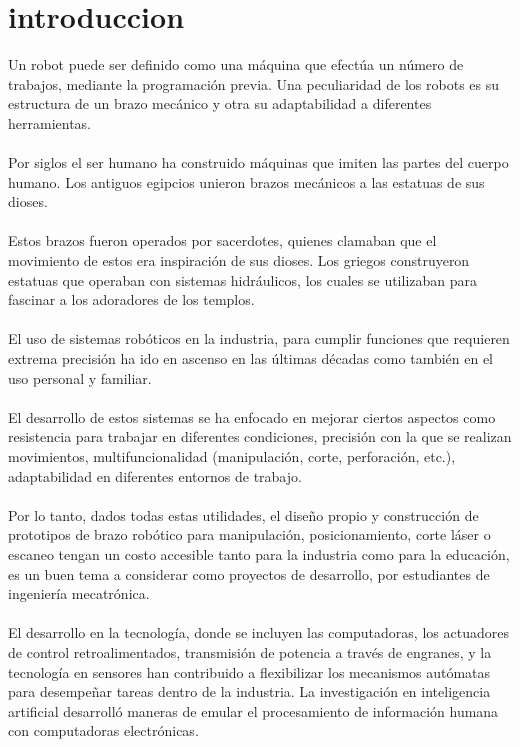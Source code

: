 \documentclass[12pt,letterpaper]{article}
\begin{document}
\section*{introduccion}
Un robot puede ser definido como una máquina que efectúa un número de trabajos, mediante la programación previa. Una peculiaridad de los robots es su estructura de un brazo mecánico y otra su adaptabilidad a diferentes herramientas.
\\\\
Por siglos el ser humano ha construido máquinas que imiten las partes del cuerpo humano. Los antiguos egipcios unieron brazos mecánicos a las estatuas de sus dioses.
\\\\ 
Estos brazos fueron operados por sacerdotes, quienes clamaban que el movimiento de estos era inspiración de sus dioses. Los griegos construyeron estatuas que operaban con sistemas hidráulicos, los cuales se utilizaban para fascinar a los adoradores de los templos.
\\\\
El uso de sistemas robóticos en la industria, para cumplir funciones que requieren extrema precisión ha ido en ascenso en las últimas décadas como también en el uso personal y familiar.
\\\\
El desarrollo de estos sistemas se ha enfocado en mejorar ciertos aspectos como resistencia para trabajar en diferentes condiciones, precisión con la que se realizan movimientos, multifuncionalidad (manipulación, corte, perforación, etc.), adaptabilidad en diferentes entornos de trabajo.
\\\\
Por lo tanto, dados todas estas utilidades, el diseño propio y construcción de prototipos de brazo robótico para manipulación, posicionamiento, corte láser o escaneo tengan un costo accesible tanto para la industria como para la educación, es un buen tema a considerar como proyectos de desarrollo, por estudiantes de ingeniería mecatrónica.
\\\\
El desarrollo en la tecnología, donde se incluyen las computadoras, los actuadores de control retroalimentados, transmisión de potencia a través de engranes, y la tecnología en sensores han contribuido a flexibilizar los mecanismos autómatas para desempeñar tareas dentro de la industria. La investigación en inteligencia artificial desarrolló maneras de emular el procesamiento de información humana con computadoras electrónicas.
\end{document}
